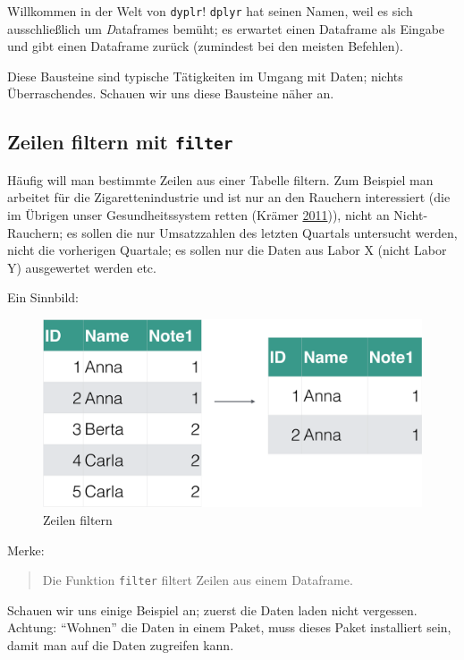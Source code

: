 \documentclass[12pt,]{book}
\begin{document}
Willkommen in der Welt von \texttt{dyplr}! \texttt{dplyr} hat seinen
Namen, weil es sich ausschließlich um \emph{D}ataframes bemüht; es
erwartet einen Dataframe als Eingabe und gibt einen Dataframe zurück
(zumindest bei den meisten Befehlen).

Diese Bausteine sind typische Tätigkeiten im Umgang mit Daten; nichts
Überraschendes. Schauen wir uns diese Bausteine näher an.

\subsection{\texorpdfstring{Zeilen filtern mit
\texttt{filter}}{Zeilen filtern mit filter}}\label{zeilen-filtern-mit-filter}

Häufig will man bestimmte Zeilen aus einer Tabelle filtern. Zum Beispiel
man arbeitet für die Zigarettenindustrie und ist nur an den Rauchern
interessiert (die im Übrigen unser Gesundheitssystem retten (Krämer
\protect\hyperlink{ref-kraemer2011wir}{2011})), nicht an Nicht-Rauchern;
es sollen die nur Umsatzzahlen des letzten Quartals untersucht werden,
nicht die vorherigen Quartale; es sollen nur die Daten aus Labor X
(nicht Labor Y) ausgewertet werden etc.

Ein Sinnbild:

\begin{figure}

{\centering \includegraphics[width=0.7\linewidth]{./images/filter} 

}

\caption{Zeilen filtern}\label{fig:fig-filter}
\end{figure}

Merke:

\begin{quote}
Die Funktion \texttt{filter} filtert Zeilen aus einem Dataframe.
\end{quote}

Schauen wir uns einige Beispiel an; zuerst die Daten laden nicht
vergessen. Achtung: ``Wohnen'' die Daten in einem Paket, muss dieses
Paket installiert sein, damit man auf die Daten zugreifen kann.
\end{document}

